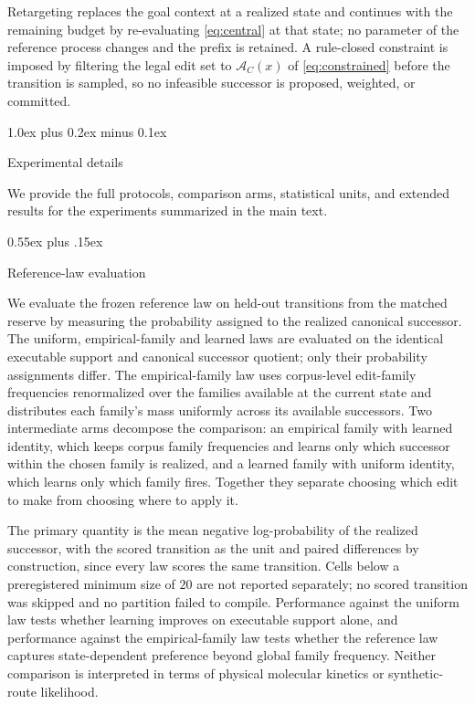 \documentclass{article}
\makeatletter
\theoremstyle{definition}
\theoremstyle{remark}
\def\section{\@startsection{section}{1}{\z@}{-1.4ex plus -0.4ex minus -.2ex}%
  {1.0ex plus 0.2ex minus 0.1ex}{\large\sc\raggedright}}
\def\subsection{\@startsection{subsection}{2}{\z@}{-1.2ex plus -0.4ex minus -.2ex}%
  {0.55ex plus .15ex}{\normalsize\sc\raggedright}}
\newcommand{\A}{\mathcal{A}}
\makeatother
\begin{document}
Retargeting replaces the goal context at a realized state and continues with the remaining budget by re-evaluating \eqref{eq:central} at that state; no parameter of the reference process changes and the prefix is retained. A rule-closed constraint is imposed by filtering the legal edit set to $\A_C(x)$ of \eqref{eq:constrained} before the transition is sampled, so no infeasible successor is proposed, weighted, or committed.

\section{Experimental details}
\label{sec:experiments}
\label{app:experiments}

We provide the full protocols, comparison arms, statistical units, and extended results for the experiments summarized in the main text.

\subsection{Reference-law evaluation}
\label{sec:exp-rtheta}
\label{app:exp-rtheta}

We evaluate the frozen reference law on held-out transitions from the matched reserve by measuring the probability assigned to the realized canonical successor. The uniform, empirical-family and learned laws are evaluated on the identical executable support and canonical successor quotient; only their probability assignments differ. The empirical-family law uses corpus-level edit-family frequencies renormalized over the families available at the current state and distributes each family's mass uniformly across its available successors. Two intermediate arms decompose the comparison: an empirical family with learned identity, which keeps corpus family frequencies and learns only which successor within the chosen family is realized, and a learned family with uniform identity, which learns only which family fires. Together they separate choosing which edit to make from choosing where to apply it.

The primary quantity is the mean negative log-probability of the realized successor, with the scored transition as the unit and paired differences by construction, since every law scores the same transition. Cells below a preregistered minimum size of $20$ are not reported separately; no scored transition was skipped and no partition failed to compile. Performance against the uniform law tests whether learning improves on executable support alone, and performance against the empirical-family law tests whether the reference law captures state-dependent preference beyond global family frequency. Neither comparison is interpreted in terms of physical molecular kinetics or synthetic-route likelihood.
\end{document}
